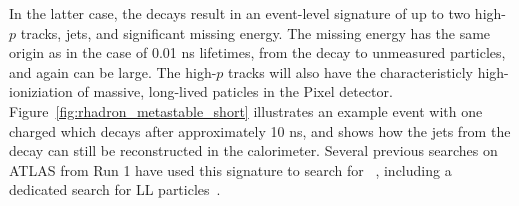 In the latter case, the decays result in an event-level signature of up to two high-$p$ tracks, jets, and significant missing energy.
The missing energy has the same origin as in the case of 0.01 ns lifetimes, from the decay to unmeasured particles, and again can be large.
The high-$p$ tracks will also have the characteristicly high-ioniziation of massive, long-lived paticles in the Pixel detector.
Figure~\ref{fig:rhadron_metastable_short} illustrates an example event with one charged \rhadron which decays after approximately 10 ns, and shows how the jets from the decay can still be reconstructed in the calorimeter.
Several previous searches on ATLAS from Run 1 have used this signature to search for \rhadrons~\cite{SUSY-2012-01, SUSY-2013-22}, including a dedicated search for \ac{LL} particles~\cite{SUSY-2014-09}.


